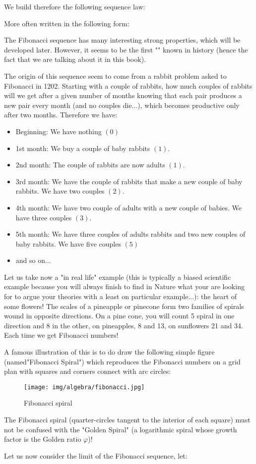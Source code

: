 	We build therefore the following sequence law:
	
	More often written in the following form:
	
	The Fibonacci sequence has many interesting strong properties, which will be developed later. However, it seems to be the first "" known in history (hence the fact that we are talking about it in this book). 
	
	The origin of this sequence seem to come from a rabbit problem asked to Fibonacci in 1202. Starting with a couple of rabbits, how much couples of rabbits will we get after a given number of months knowing that each pair produces a new pair every month (and no couples die...), which becomes productive only after two months. Therefore we have:
	\begin{itemize}
		\item Beginning: We have nothing $(0)$
		\item 1st month: We buy a couple of baby rabbits $(1)$.
		\item 2nd month: The couple of rabbits are now adults $(1)$.
		\item 3rd month: We have the couple of rabbits that make a new couple of baby rabbits. We have two couples $(2)$.
		\item 4th month: We have two couple of adults with a new couple of babies. We have three couples $(3)$.
		\item 5th month: We have three couples of adults rabbits and two new couples of baby rabbits. We have five couples $(5)$
		\item and so on...
	\end{itemize}
	
	Let us take now a "in real life" example (this is typically a biased scientific example because you will always finish to find in Nature what your are looking for to argue your theories with a least on particular example...): the heart of some flowers! The scales of a pineapple or pinecone form two families of spirals wound in opposite directions. On a pine cone, you will count 5 spiral in one direction and 8 in the other, on pineapples, 8 and 13, on sunflowers 21 and 34. Each time we get Fibonacci numbers!
	
	A famous illustration of this is to do draw the following simple figure (named"Fibonacci Spiral") which reproduces the Fibonacci numbers on a grid plan with squares and corners connect with arc circles:
	
	\begin{figure}[H]
		\centering
		\texttt{[image: img/algebra/fibonacci.jpg]}
		\caption{Fibonacci spiral}
	\end{figure}
	\begin{tcolorbox}[title=Remark,colframe=black,arc=10pt]
	The Fibonacci spiral (quarter-circles tangent to the interior of each square) must not be confused with the "Golden Spiral" (a logarithmic spiral whose growth factor is the Golden ratio $\varphi$)!
	\end{tcolorbox}
	Let us now consider the limit of the Fibonacci sequence, let:
	
